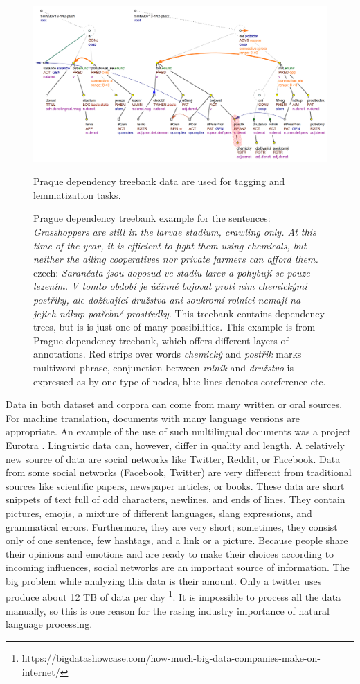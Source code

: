 \begin{figure}
\includegraphics[width=1\textwidth]{../img/prague_dep_treebank.png}
\caption{
Prague dependency treebank example \cite{PDT35} for the sentences:
\textit{Grasshoppers are still in the larvae stadium, crawling only. At this time of the year, it is efficient to fight them using chemicals, but neither the ailing cooperatives nor private farmers can afford them.} czech: \textit{Sarančata jsou doposud ve stadiu larev a pohybují se pouze lezením. V tomto období je účinné bojovat proti nim chemickými postřiky, ale dožívající družstva ani soukromí rolníci nemají na jejich nákup potřebné prostředky}. This treebank contains dependency trees, but is is just one of many possibilities. This example is from Prague dependency treebank, which offers different layers of annotations. Red strips over words \textit{chemický} and \textit{postřik} marks multiword phrase, conjunction between \textit{rolník} and \textit{družstvo} is expressed as by one type of nodes, blue lines denotes coreference etc.} Praque dependency treebank data are used for tagging and lemmatization tasks.
\label{fig:pdt}
\end{figure}

Data in both dataset and corpora can come from many written or oral sources. For machine translation, documents with many language versions are appropriate. An example of the use of such multilingual documents was a project Eurotra \citep{oakley1995final}. Linguistic data can, however,  differ in quality and length.  A relatively new source of data are social networks like Twitter, Reddit, or Facebook. Data from some social networks (Facebook, Twitter) are very different from traditional sources like scientific papers, newspaper articles, or books.  These data are short snippets of text full of odd characters, newlines, and ends of lines. They contain pictures, emojis, a mixture of different languages, slang expressions, and grammatical errors. Furthermore, they are very short; sometimes, they consist only of one sentence, few hashtags, and a link or a picture. Because people share their opinions and emotions and are ready to make their choices according to incoming influences, social networks are an important source of information. The big problem while analyzing this data is their amount. Only a twitter uses produce about 12 TB of data per day \footnote{https://bigdatashowcase.com/how-much-big-data-companies-make-on-internet/}. It is impossible to process all the data manually, so this is one reason for the rasing industry importance of natural language processing.

